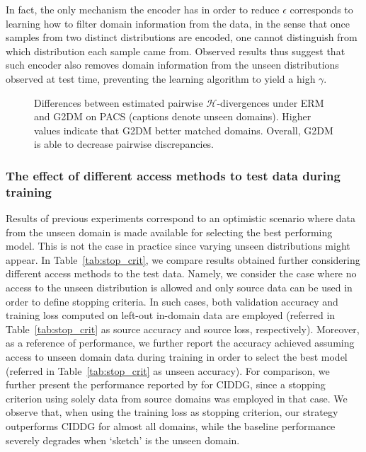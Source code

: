 \documentclass{article}
\begin{document}
In fact, the only mechanism the encoder has in order to reduce $\epsilon$ corresponds to learning how to filter domain information from the data, in the sense that once samples from two distinct distributions are encoded, one cannot distinguish from which distribution each sample came from. Observed results thus suggest that such encoder also removes domain information from the unseen distributions observed at test time, preventing the learning algorithm to yield a high $\gamma$.

\begin{figure}[h]
	\centering
	\;
    \;
	\;
	\caption{Differences between estimated pairwise $\mathcal{H}$-divergences under ERM and G2DM on PACS (captions denote unseen domains). Higher values indicate that G2DM better matched domains. Overall, G2DM is able to decrease pairwise discrepancies.}
	\label{fig:a_dist}
 \end{figure}





\subsubsection{The effect of different access methods to test data during training} 
Results of previous experiments correspond to an optimistic scenario where data from the unseen domain is made available for selecting the best performing model. This is not the case in practice since varying unseen distributions might appear. In Table~\ref{tab:stop_crit}, we compare results obtained further considering different access methods to the test data. Namely, we consider the case where no access to the unseen distribution is allowed and only source data can be used in order to define stopping criteria. In such cases, both validation accuracy and training loss computed on left-out in-domain data are employed (referred in Table~\ref{tab:stop_crit} as source accuracy and source loss, respectively). Moreover, as a reference of performance, we further report the accuracy achieved assuming access to unseen domain data during training in order to select the best model (referred in Table~\ref{tab:stop_crit} as unseen accuracy). For comparison, we further present the performance reported by \cite{li2018deep} for CIDDG, since a stopping criterion using solely data from source domains was employed in that case. We observe that, when using the training loss as stopping criterion, our strategy outperforms CIDDG for almost all domains, while the baseline performance severely degrades when `sketch' is the unseen domain. 
\end{document}
